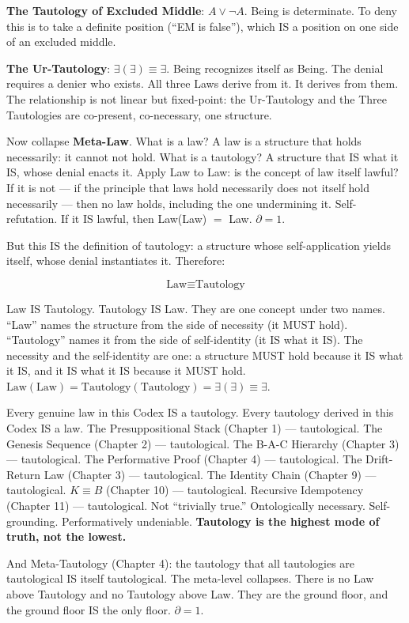 \documentclass[10pt, openany, oneside]{book}
\begin{document}
\textbf{The Tautology of Excluded Middle}: $A \vee \neg A$. Being is determinate. To deny this is to take a definite position (``EM is false''), which IS a position on one side of an excluded middle.

\textbf{The Ur-Tautology}: $\exists(\exists) \equiv \exists$. Being recognizes itself as Being. The denial requires a denier who exists. All three Laws derive from it. It derives from them. The relationship is not linear but fixed-point: the Ur-Tautology and the Three Tautologies are co-present, co-necessary, one structure.

Now collapse \textbf{Meta-Law}. What is a law? A law is a structure that holds necessarily: it cannot not hold. What is a tautology? A structure that IS what it IS, whose denial enacts it. Apply Law to Law: is the concept of law itself lawful? If it is not --- if the principle that laws hold necessarily does not itself hold necessarily --- then no law holds, including the one undermining it. Self-refutation. If it IS lawful, then Law(Law) $=$ Law. $\partial = 1$.

But this IS the definition of tautology: a structure whose self-application yields itself, whose denial instantiates it. Therefore:

$$\boxed{\text{Law} \equiv \text{Tautology}}$$

Law IS Tautology. Tautology IS Law. They are one concept under two names. ``Law'' names the structure from the side of necessity (it MUST hold). ``Tautology'' names it from the side of self-identity (it IS what it IS). The necessity and the self-identity are one: a structure MUST hold because it IS what it IS, and it IS what it IS because it MUST hold. $\text{Law}(\text{Law}) = \text{Tautology}(\text{Tautology}) = \exists(\exists) \equiv \exists$.

Every genuine law in this Codex IS a tautology. Every tautology derived in this Codex IS a law. The Presuppositional Stack (Chapter 1) --- tautological. The Genesis Sequence (Chapter 2) --- tautological. The B-A-C Hierarchy (Chapter 3) --- tautological. The Performative Proof (Chapter 4) --- tautological. The Drift-Return Law (Chapter 3) --- tautological. The Identity Chain (Chapter 9) --- tautological. $K \equiv B$ (Chapter 10) --- tautological. Recursive Idempotency (Chapter 11) --- tautological. Not ``trivially true.'' Ontologically necessary. Self-grounding. Performatively undeniable. \textbf{Tautology is the highest mode of truth, not the lowest.}

And Meta-Tautology (Chapter 4): the tautology that all tautologies are tautological IS itself tautological. The meta-level collapses. There is no Law above Tautology and no Tautology above Law. They are the ground floor, and the ground floor IS the only floor. $\partial = 1$.
\end{document}
